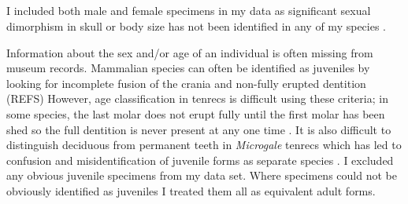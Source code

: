 \subsection{}
I included both male and female specimens in my data as significant sexual dimorphism in skull or body size has not been identified in any of my species \citep[NEED MORE REFERENCES][]{Olson2004}.

Information about the sex and/or age of an individual is often missing from museum records. Mammalian species can often be identified as juveniles by looking for incomplete fusion of the crania and non-fully erupted dentition (REFS) However, age classification in tenrecs is difficult using these criteria; in some species, the last molar does not erupt fully until the first molar has been shed so the full dentition is never present at any one time \citep{Nowak1983}. It is also difficult to distinguish deciduous from permanent teeth in \textit{Microgale} tenrecs \citep{Asher2008} which has led to confusion and misidentification of juvenile forms as separate species \citep{Olson2004}. I excluded any obvious juvenile specimens from my data set. Where specimens could not be obviously identified as juveniles I treated them all as equivalent adult forms. 

